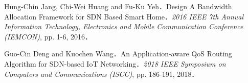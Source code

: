 \documentclass[a4paper,10pt,twocolumn,uplatex]{jsarticle}
\begin{document}
\footnotesize{
  \begin{thebibliography}{99}
     Hung-Chin Jang, Chi-Wei Huang and Fu-Ku Yeh．Design A Bandwidth Allocation Framework for SDN Based Smart Home．\textit{2016 IEEE 7th Annual Information Technology, Electronics and Mobile Communication Conference (IEMCON)}, pp. 1-6, 2016．

     Guo-Cin Deng and Kuochen Wang．An Application-aware QoS Routing Algorithm for SDN-based IoT Networking．\textit{2018 IEEE Symposium on Computers and Communications (ISCC)}, pp. 186-191, 2018．
  \end{thebibliography}
}

\end{document}
